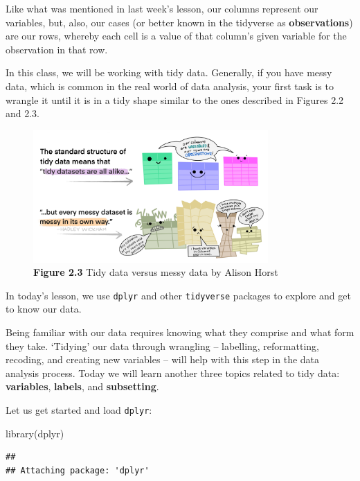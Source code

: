 \documentclass[
]{book}
\newenvironment{Shaded}{\begin{snugshade}}{\end{snugshade}}
\newcommand{\FunctionTok}[1]{\textcolor[rgb]{0.00,0.00,0.00}{#1}}
\newcommand{\NormalTok}[1]{#1}
\begin{document}
Like what was mentioned in last week's lesson, our columns represent our variables, but, also, our cases (or better known in the tidyverse as \textbf{observations}) are our rows, whereby each cell is a value of that column's given variable for the observation in that row.

In this class, we will be working with tidy data. Generally, if you have messy data, which is common in the real world of data analysis, your first task is to wrangle it until it is in a tidy shape similar to the ones described in Figures 2.2 and 2.3.

\begin{figure}
\centering
\includegraphics[width=0.8\textwidth,height=\textheight]{Images/tidydata_2.jpg}
\caption{\textbf{Figure 2.3} Tidy data versus messy data by Alison Horst}
\end{figure}

In today's lesson, we use \texttt{dplyr} and other \texttt{tidyverse} packages to explore and get to know our data.

Being familiar with our data requires knowing what they comprise and what form they take. `Tidying' our data through wrangling -- labelling, reformatting, recoding, and creating new variables -- will help with this step in the data analysis process. Today we will learn another three topics related to tidy data: \textbf{variables}, \textbf{labels}, and \textbf{subsetting}.

Let us get started and load \texttt{dplyr}:

\begin{Shaded}
\begin{Highlighting}[]
\FunctionTok{library}\NormalTok{(dplyr)}
\end{Highlighting}
\end{Shaded}

\begin{verbatim}
## 
## Attaching package: 'dplyr'
\end{verbatim}
\end{document}
